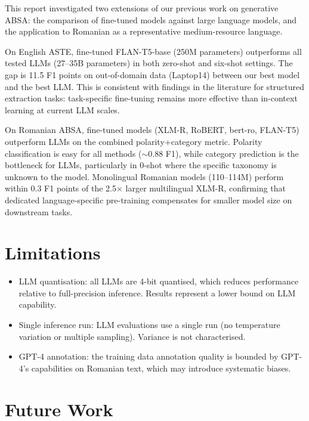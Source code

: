 \documentclass[12pt,a4paper]{report}
\begin{document}
This report investigated two extensions of our previous work on generative ABSA: the comparison of fine-tuned models against large language models, and the application to Romanian as a representative medium-resource language.

On English ASTE, fine-tuned FLAN-T5-base (250M parameters) outperforms all tested LLMs (27--35B parameters) in both zero-shot and six-shot settings. The gap is 11.5 F1 points on out-of-domain data (Laptop14) between our best model and the best LLM. This is consistent with findings in the literature for structured extraction tasks: task-specific fine-tuning remains more effective than in-context learning at current LLM scales.

On Romanian ABSA, fine-tuned models (XLM-R, RoBERT, bert-ro, FLAN-T5) outperform LLMs on the combined polarity+category metric. Polarity classification is easy for all methods ($\sim$0.88 F1), while category prediction is the bottleneck for LLMs, particularly in 0-shot where the specific taxonomy is unknown to the model. Monolingual Romanian models (110--114M) perform within 0.3 F1 points of the 2.5$\times$ larger multilingual XLM-R, confirming that dedicated language-specific pre-training compensates for smaller model size on downstream tasks.

\section{Limitations}

\begin{itemize}
    \item LLM quantisation: all LLMs are 4-bit quantised, which reduces performance relative to full-precision inference. Results represent a lower bound on LLM capability.
    \item Single inference run: LLM evaluations use a single run (no temperature variation or multiple sampling). Variance is not characterised.
    \item GPT-4 annotation: the training data annotation quality is bounded by GPT-4's capabilities on Romanian text, which may introduce systematic biases.
\end{itemize}

\section{Future Work}
\end{document}
